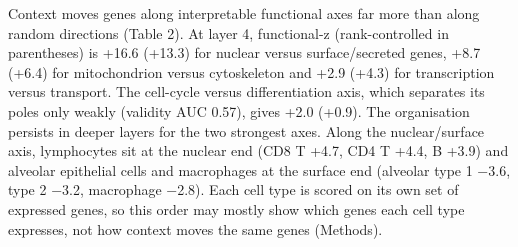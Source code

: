\documentclass[
  11pt,
]{article}
\begin{document}
Context moves genes along interpretable functional axes far more than
along random directions (Table 2). At layer 4, functional-z
(rank-controlled in parentheses) is +16.6 (+13.3) for nuclear versus
surface/secreted genes, +8.7 (+6.4) for mitochondrion versus
cytoskeleton and +2.9 (+4.3) for transcription versus transport. The
cell-cycle versus differentiation axis, which separates its poles only
weakly (validity AUC 0.57), gives +2.0 (+0.9). The organisation persists
in deeper layers for the two strongest axes. Along the nuclear/surface
axis, lymphocytes sit at the nuclear end (CD8 T +4.7, CD4 T +4.4, B
+3.9) and alveolar epithelial cells and macrophages at the surface end
(alveolar type 1 −3.6, type 2 −3.2, macrophage −2.8). Each cell type is
scored on its own set of expressed genes, so this order may mostly show
which genes each cell type expresses, not how context moves the same
genes (Methods).
\end{document}
